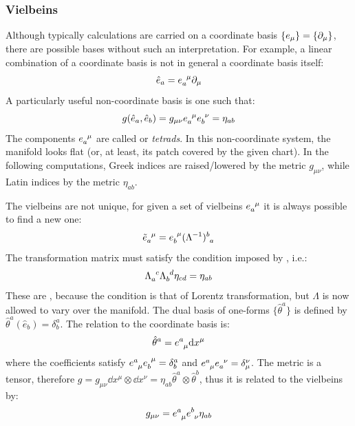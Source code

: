 \subsubsection{Vielbeins}

Although typically calculations are carried on a coordinate basis $ \{e_\mu\} = \{\partial_\mu\} $, there are possible bases without such an interpretation. For example, a linear combination of a coordinate basis is not in general a coordinate basis itself:
\begin{equation}
  \hat{e}_a = \tensor{e}{_a^\mu} \pa_\mu
\end{equation}
A particularly useful non-coordinate basis is one such that:
\begin{equation}
  g(\hat{e}_a, \hat{e}_b) = g_{\mu \nu} \tensor{e}{_a^\mu} \tensor{e}{_b^\nu} = \eta_{ab}
  \label{eq:vielbeins-def}
\end{equation}
The components $ \tensor{e}{_a^\mu} $ are called  or \textit{tetrads}. In this non-coordinate system, the manifold looks flat (or, at least, its patch covered by the given chart). In the following computations, Greek indices are raised/lowered by the metric $ g_{\mu \nu} $, while Latin indices by the metric $ \eta_{ab} $.

The vielbeins are not unique, for given a set of vielbeins $ \tensor{e}{_a^\mu} $ it is always possible to find a new one:
\begin{equation}
  \tensor{\tilde{e}}{_a^\mu} = \tensor{e}{_b^\mu} \tensor{(\Lambda^{-1})}{^b_a}
\end{equation}
The transformation matrix must satisfy the condition imposed by , i.e.:
\begin{equation}
  \tensor{\Lambda}{_a^c} \tensor{\Lambda}{_b^d} \eta_{cd} = \eta_{ab}
\end{equation}
These are , because the condition is that of Lorentz transformation, but $ \Lambda $ is now allowed to vary over the manifold. The dual basis of one-forms $ \{\hat{\theta}^a\} $ is defined by $ \hat{\theta}^a(\hat{e}_b) = \delta^a_b $. The relation to the coordinate basis is:
\begin{equation}
  \hat{\theta}^a = \tensor{e}{^a_\mu} \dd x^\mu
\end{equation}
where the coefficients satisfy $ \tensor{e}{^a_\mu} \tensor{e}{_b^\mu} = \delta^a_b $ and $ \tensor{e}{^a_\mu} \tensor{e}{_a^\nu} = \delta_\mu^\nu $.
The metric is a tensor, therefore $ g = g_{\mu \nu} \dd x^\mu \otimes \dd x^\nu = \eta_{ab} \hat{\theta}^a \otimes \hat{\theta}^b $, thus it is related to the vielbeins by:
\begin{equation}
  g_{\mu \nu} = \tensor{e}{^a_\mu} \tensor{e}{^b_\nu} \eta_{ab}
\end{equation}

